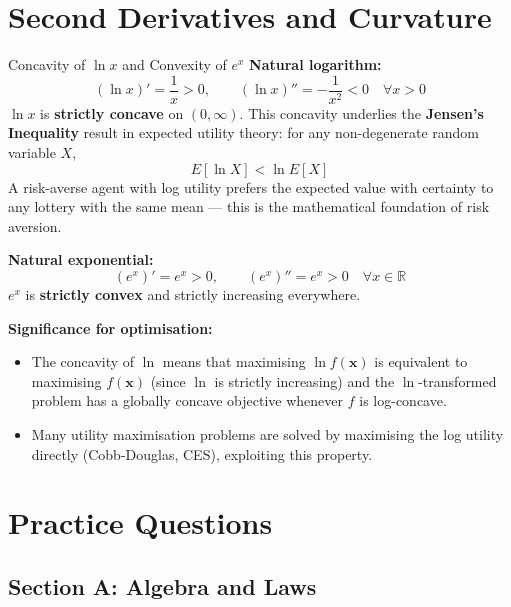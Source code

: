 \documentclass[12pt, a4paper]{article}
\theoremstyle{definition}
\newcommand{\R}{\mathbb{R}}
\newcommand{\bx}{\mathbf{x}}
\begin{document}
\section{Second Derivatives and Curvature}

\begin{exbox}{Concavity of $\ln x$ and Convexity of $e^x$}
\textbf{Natural logarithm:}
\[
  (\ln x)' = \frac{1}{x} > 0, \qquad (\ln x)'' = -\frac{1}{x^2} < 0 \quad \forall x > 0
\]
$\ln x$ is \textbf{strictly concave} on $(0,\infty)$. This concavity underlies the \textbf{Jensen's Inequality} result in expected utility theory: for any non-degenerate random variable $X$,
\[
  E[\ln X] < \ln E[X]
\]
A risk-averse agent with log utility prefers the expected value with certainty to any lottery with the same mean --- this is the mathematical foundation of risk aversion.

\textbf{Natural exponential:}
\[
  (e^x)' = e^x > 0, \qquad (e^x)'' = e^x > 0 \quad \forall x \in \R
\]
$e^x$ is \textbf{strictly convex} and strictly increasing everywhere.

\textbf{Significance for optimisation:}
\begin{itemize}
  \item The concavity of $\ln$ means that maximising $\ln f(\bx)$ is equivalent to maximising $f(\bx)$ (since $\ln$ is strictly increasing) and the $\ln$-transformed problem has a globally concave objective whenever $f$ is log-concave.
  \item Many utility maximisation problems are solved by maximising the log utility directly (Cobb-Douglas, CES), exploiting this property.
\end{itemize}
\end{exbox}

\section{Practice Questions}

\subsection{Section A: Algebra and Laws}
\end{document}
